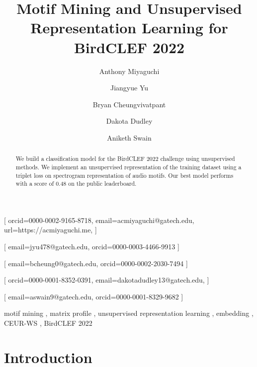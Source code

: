 \documentclass[
]{ceurart}
\begin{document}


\title{Motif Mining and Unsupervised Representation Learning for BirdCLEF 2022}

\author[1]{Anthony Miyaguchi}[
orcid=0000-0002-9165-8718,
email=acmiyaguchi@gatech.edu,
url=https://acmiyaguchi.me,
]
\author[1]{Jiangyue Yu}[
email=jyu478@gatech.edu,
orcid=0000-0003-4466-9913
]
\author[1]{Bryan Cheungvivatpant}[
email=bcheung0@gatech.edu,
orcid=0000-0002-2030-7494
]
\author[1]{Dakota Dudley}[
orcid=0000-0001-8352-0391,
email=dakotadudley13@gatech.edu,
]
\author[1]{Aniketh Swain}[
email=aswain9@gatech.edu,
orcid=0000-0001-8329-9682
]

\address[1]{Georgia Institute of Technology, North Ave NW, Atlanta, GA 30332}

\begin{abstract}
    We build a classification model for the BirdCLEF 2022 challenge using unsupervised methods. We implement an unsupervised representation of the training dataset using a triplet loss on spectrogram representation of audio motifs. Our best model performs with a score of 0.48 on the public leaderboard.
\end{abstract}

\begin{keywords}
  motif mining \sep
  matrix profile \sep
  unsupervised representation learning \sep
  embedding \sep
  CEUR-WS \sep
  BirdCLEF 2022
\end{keywords}

\maketitle

\section{Introduction}
\end{document}
